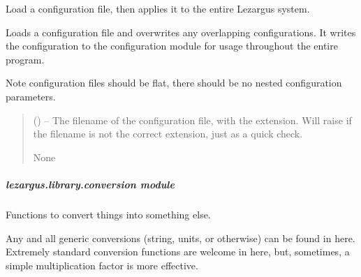 \documentclass[letterpaper,11pt,english]{sphinxmanual}
\begin{document}
\begin{savenotes}\begin{fulllineitems}
\label{\detokenize{code/lezargus.library.config:lezargus.library.config.load_then_apply_configuration}}
\pysigstartsignatures
{}
\pysigstopsignatures
\sphinxAtStartPar
Load a configuration file, then applies it to the entire Lezargus system.

\sphinxAtStartPar
Loads a configuration file and overwrites any overlapping
configurations. It writes the configuration to the configuration module
for usage throughout the entire program.

\sphinxAtStartPar
Note configuration files should be flat, there should be no nested
configuration parameters.
\begin{quote}\begin{description}
\sphinxAtStartPar
{} () – The filename of the configuration file, with the extension. Will raise
if the filename is not the correct extension, just as a quick check.

\sphinxAtStartPar
None

\end{description}\end{quote}

\end{fulllineitems}\end{savenotes}


\sphinxstepscope


\subparagraph{lezargus.library.conversion module}
\label{\detokenize{code/lezargus.library.conversion:module-lezargus.library.conversion}}\label{\detokenize{code/lezargus.library.conversion:lezargus-library-conversion-module}}\label{\detokenize{code/lezargus.library.conversion::doc}}
\sphinxAtStartPar
Functions to convert things into something else.

\sphinxAtStartPar
Any and all generic conversions (string, units, or otherwise) can be found in
here. Extremely standard conversion functions are welcome in here, but,
sometimes, a simple multiplication factor is more effective.
\end{document}
